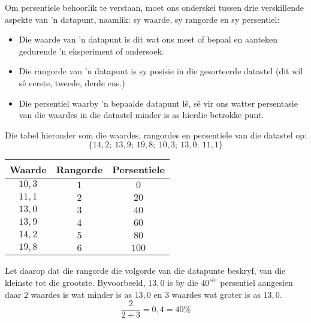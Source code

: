 Om persentiele behoorlik te verstaan, moet ons onderskei tussen drie verskillende aspekte van ’n datapunt, naamlik: sy waarde, sy rangorde en sy persentiel:
\begin{itemize}
 \item Die waarde van ’n datapunt is dit wat ons meet of bepaal en aanteken gedurende ’n eksperiment of ondersoek.
\item Die rangorde van ’n datapunt is sy posisie in die gesorteerde datastel (dit wil sê eerste, tweede, derde ens.)  
\item Die persentiel waarby ’n bepaalde datapunt lê, sê vir ons watter persentasie van die waardes in die datastel minder is as hierdie betrokke punt.
\end{itemize}
\par
   Die tabel hieronder som die waardes, rangordes en persentiele van die datastel op:
  \begin{equation*}
    \{14,2;\ 13,9;\ 19,8;\ 10,3;\ 13,0;\ 11,1\}
  \end{equation*}

  \begin{center}
    \begin{tabular}{|c|c|c|} \hline

      \textbf{Waarde} & \textbf{Rangorde} & \textbf{Persentiele} \\\hline

      $10,3$  & $1$    & $0$ \\\hline
      $11,1$  & $2$    & $20$ \\\hline
      $13,0$  & $3$    & $40$ \\\hline
      $13,9$  & $4$    & $60$ \\\hline
      $14,2$  & $5$    & $80$ \\\hline
      $19,8$  & $6$    & $100$ \\\hline

    \end{tabular}
  \end{center}

 Let daarop dat die rangorde die volgorde van die datapunte beskryf, van die kleinste tot die grootste. Byvoorbeeld, $13,0$ is by die $40^{ste}$ persentiel aangesien daar $2$ waardes is wat minder is as $13,0$ en $3$ waardes wat groter is as $13,0$. 
  \begin{equation*}
    \frac{2}{2+3} = 0,4 = 40\%
  \end{equation*}

